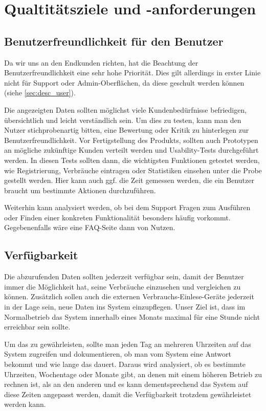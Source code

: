 \section{Qualtitätsziele und -anforderungen}
\label{quality_requirements}

\subsection{Benutzerfreundlichkeit für den Benutzer}
Da wir uns an den Endkunden richten, hat die Beachtung der Benutzerfreundlichkeit eine sehr hohe Priorität. Dies gilt allerdings in erster Linie nicht für Support oder Admin-Oberflächen, da diese geschult werden können (siehe \ref{sec:desc_user}).

Die angezeigten Daten sollten möglichst viele Kundenbedürfnisse
befriedigen, übersichtlich und leicht verständlich sein.
Um dies zu testen, kann man den Nutzer stichprobenartig bitten, eine Bewertung oder Kritik zu hinterlegen zur Benutzerfreundlichkeit.
Vor Fertigstellung des Produkts, sollten auch Prototypen an mögliche zukünftige Kunden verteilt werden und Usability-Tests durchgeführt werden. In diesen Tests sollten dann, die wichtigsten Funktionen getestet werden, wie Registrierung, Verbräuche eintragen oder Statistiken einsehen unter die Probe gestellt werden.
Hier kann auch ggf. die Zeit gemessen werden, die ein Benutzer braucht um bestimmte Aktionen durchzuführen.

Weiterhin kann analysiert werden, ob bei dem Support Fragen zum Ausführen oder Finden einer konkreten Funktionalität besonders häufig vorkommt. Gegebenenfalls wäre eine FAQ-Seite dann von Nutzen.

\subsection{Verfügbarkeit}
Die abzurufenden Daten sollten jederzeit verfügbar sein,
damit der Benutzer immer die Möglichkeit hat,
seine Verbräuche einzusehen und vergleichen zu können. Zusätzlich sollen auch die externen Verbrauchs-Einlese-Geräte jederzeit in der Lage sein, neue Daten ins System einzupflegen.
Unser Ziel ist, dass im Normalbetrieb das System innerhalb eines Monats maximal für eine Stunde nicht erreichbar sein sollte.

Um das zu gewährleisten, sollte man jeden Tag an mehreren Uhrzeiten auf das System zugreifen
und dokumentieren, ob man vom System eine Antwort bekommt und wie lange das dauert.
Daraus wird analysiert, ob es bestimmte Uhrzeiten, Wochentage oder Monate gibt,
an denen mit einem höheren Betrieb zu rechnen ist, als an den anderen und es kann dementsprechend das
System auf diese Zeiten angepasst werden, damit die Verfügbarkeit trotzdem gewährleistet werden kann.

